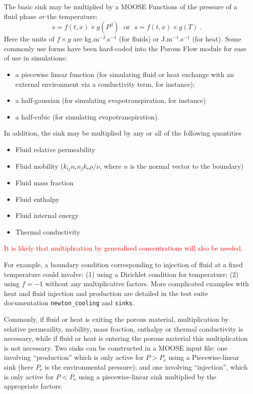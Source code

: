 \documentclass[12pt]{report}
\begin{document}
The basic sink may be multiplied by a MOOSE Functions of the pressure
of a fluid phase {\em or} the temperature:
\begin{equation}
s = f(t, x) \times g(P^{\beta}) \ \ \ \mbox{or}\ \ \ s = f(t, x)
\times g(T) \ .
\end{equation}
Here the units of $f\times g$ are kg.m$^{-2}$.s$^{-1}$ (for fluids) or
J.m$^{-1}$.s$^{-1}$ (for heat).  Some commonly use forms have been
hard-coded into the Porous Flow module for ease of use in simulations:
\begin{itemize}
\item a piecewise linear function (for simulating fluid or heat
  exchange with an external environment via a conductivity term, for instance);
\item a half-gaussian (for simulating evapotranspiration, for
  instance)
\item a half-cubic (for simulating evapotranspiration).
\end{itemize}

In addition, the sink may be multiplied by any or all of the following
quantities
\begin{itemize}
\item Fluid relative permeability
\item Fluid mobility ($k_{ij}n_{i}n_{j}k_{r} \rho / \nu$, where $n$ is the
  normal vector to the boundary)
\item Fluid mass fraction
\item Fluid enthalpy
\item Fluid internal energy
\item Thermal conductivity
\end{itemize}
\textcolor{red}{It is likely that multiplication by generalised
  concentrations will also be needed.}

For example, a boundary condition corresponding to injection of fluid
at a fixed temperature could involve: (1) using a Dirichlet condition
for temperature; (2) using $f=-1$ without any multiplicative factors.
More complicated examples with heat and fluid injection and production
are detailed in the test suite documentation {\tt newton\_cooling} and
{\tt sinks}.

Commonly, if fluid or heat is exiting the porous
material, multiplication by relative permeaility, mobility, mass
fraction, enthalpy or thermal conductivity is necessary, while if
fluid or heat is entering the porous material this multiplication is
not necessary.  Two sinks can be constructed in a MOOSE input file: one involving
``production'' which is only active for $P>P_{\mathrm{e}}$ using a
Piecewise-linear sink (here $P_{\mathrm{e}}$ is the environmental
pressure); and one involving ``injection'', which is only active for
$P<P_{\mathrm{e}}$ using a piecewise-linear sink multiplied by the
appropriate factors.
\end{document}
